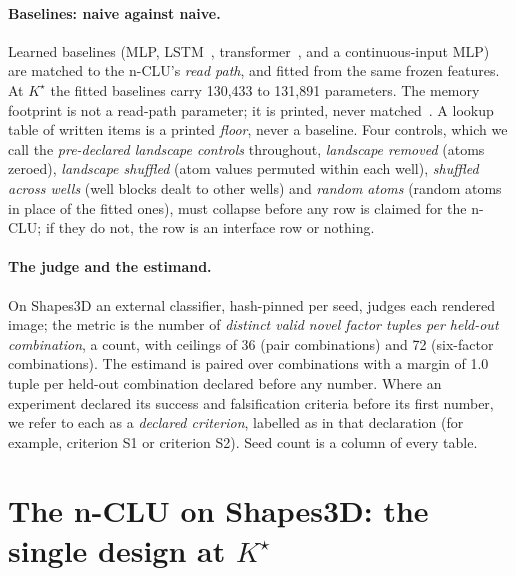\documentclass{article} %
\newcommand{\Kstar}{\ensuremath{K^{\star}}}
\begin{document}
\paragraph{Baselines: naive against naive.} Learned baselines (MLP, LSTM~\citep{hochreiter1997long}, transformer~\citep{vaswani2017attention}, and a
continuous-input MLP) are matched to the n-CLU's \emph{read path}, and fitted from the same
frozen features. At $\Kstar$ the fitted baselines carry 130,433 to 131,891 parameters.
The memory footprint is not a read-path parameter; it is printed, never matched~\citep{borgeaud2021improving,khandelwal2020generalization,lample2019large}. A lookup table
of written items is a printed \emph{floor}, never a baseline. Four controls, which we call the \emph{pre-declared
landscape controls} throughout, \emph{landscape removed} (atoms zeroed), \emph{landscape shuffled} (atom values permuted within each well), \emph{shuffled across wells}
(well blocks dealt to other wells) and \emph{random atoms} (random atoms in place of the fitted ones), must collapse before any
row is claimed for the n-CLU; if they do not, the row is an interface row or nothing.

\paragraph{The judge and the estimand.} On Shapes3D an external classifier, hash-pinned per
seed, judges each rendered image; the metric is the number of \emph{distinct valid novel
factor tuples per held-out combination}, a count, with ceilings of 36 (pair combinations) and 72 (six-factor
combinations). The estimand is paired over combinations with a margin of 1.0 tuple per held-out combination declared
before any number. %
Where an experiment declared its success and falsification criteria before its first
number, we refer to each as a \emph{declared criterion}, labelled as in that
declaration (for example, criterion S1 or criterion S2).
Seed count is a column of every table.

\section{The n-CLU on Shapes3D: the single design at $\Kstar$}
\label{sec:shapes}
\end{document}

